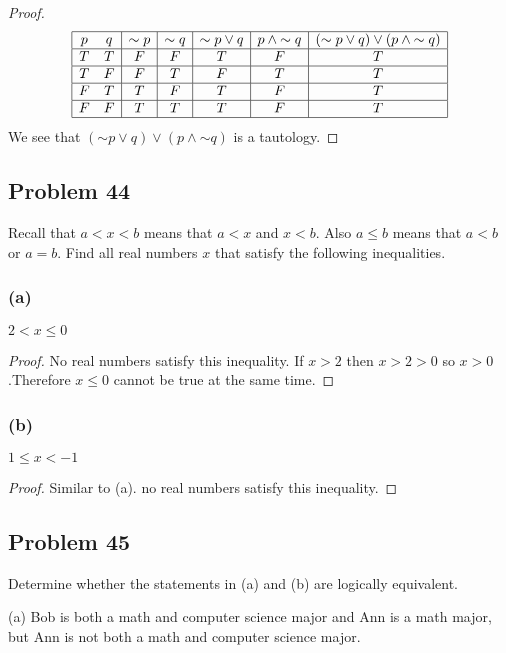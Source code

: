 \documentclass[14pt]{extarticle}
\begin{document}
\begin{proof}
$$
\begin{array}{|cc|c|c|c|c|c|}
\hline
p & q & {\sim p} & {\sim q} & {\sim p} \vee q & p \wedge {\sim q} &
({\sim p} \vee q) \vee (p \wedge {\sim q}) \\
\hline
T & T & F & F & T & F & T \\
\hline
T & F & F & T & F & T & T \\
\hline
F & T & T & F & T & F & T \\
\hline
F & F & T & T & T & F & T \\
\hline
\end{array}
$$
We see that $({\sim p} \vee q) \vee (p \wedge {\sim q})$ is a tautology.
\end{proof}

\subsection{Problem 44}
Recall that $a < x < b$ means that $a < x$ and $x < b$. Also $a \leq b$ means
that $a < b$ or $a = b$. Find all real numbers $x$ that satisfy the following
inequalities.

\subsubsection{(a)}
$2 < x \leq 0$

\begin{proof}
No real numbers satisfy this inequality. If $x > 2$ then $x > 2 > 0$ so $x >
0$.Therefore $x \leq 0$ cannot be true at the same time.
\end{proof}

\subsubsection{(b)}
$1 \leq x < -1$

\begin{proof}
Similar to (a). no real numbers satisfy this inequality.
\end{proof}

\subsection{Problem 45}
Determine whether the statements in (a) and (b) are logically equivalent.

(a)
Bob is both a math and computer science major and Ann is a math major, but Ann
is not both a math and computer science major.
\end{document}
